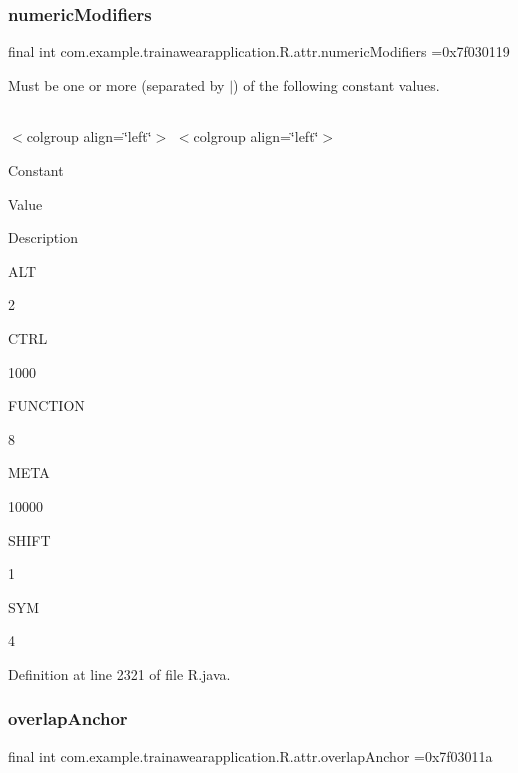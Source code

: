 \subsubsection{\texorpdfstring{numericModifiers}{numericModifiers}}
{\footnotesize\ttfamily final int com.\+example.\+trainawearapplication.\+R.\+attr.\+numeric\+Modifiers =0x7f030119\hspace{0.3cm}{\ttfamily [static]}}

Must be one or more (separated by \textquotesingle{}$\vert$\textquotesingle{}) of the following constant values.

\tabulinesep=1mm
\begin{longtabu}spread 0pt [c]{*{0}{|X[-1]}|}
\hline
\end{longtabu}
$<$colgroup align=\char`\"{}left\char`\"{}$>$ $<$colgroup align=\char`\"{}left\char`\"{}$>$ 

Constant

Value

Description 

A\+LT

2

C\+T\+RL

1000

F\+U\+N\+C\+T\+I\+ON

8

M\+E\+TA

10000

S\+H\+I\+FT

1

S\+YM

4

Definition at line 2321 of file R.\+java.

\mbox{\label{classcom_1_1example_1_1trainawearapplication_1_1_r_1_1attr_a49eb5ef78fe093f4bc28fee24f161a12}} 
\subsubsection{\texorpdfstring{overlapAnchor}{overlapAnchor}}
{\footnotesize\ttfamily final int com.\+example.\+trainawearapplication.\+R.\+attr.\+overlap\+Anchor =0x7f03011a\hspace{0.3cm}{\ttfamily [static]}}

